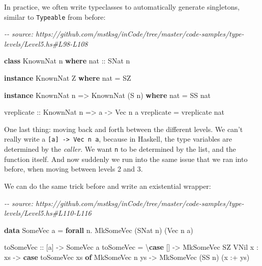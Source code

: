 \documentclass[]{article}
\newenvironment{Shaded}{}{}
\newcommand{\CommentTok}[1]{\textcolor[rgb]{0.38,0.63,0.69}{\textit{#1}}}
\newcommand{\DataTypeTok}[1]{\textcolor[rgb]{0.56,0.13,0.00}{#1}}
\newcommand{\KeywordTok}[1]{\textcolor[rgb]{0.00,0.44,0.13}{\textbf{#1}}}
\newcommand{\NormalTok}[1]{#1}
\newcommand{\OperatorTok}[1]{\textcolor[rgb]{0.40,0.40,0.40}{#1}}
\newcommand{\OtherTok}[1]{\textcolor[rgb]{0.00,0.44,0.13}{#1}}
\begin{document}
In practice, we often write typeclasses to automatically generate singletons,
similar to \texttt{Typeable} from before:

\begin{Shaded}
\begin{Highlighting}[]
\CommentTok{{-}{-} source: https://github.com/mstksg/inCode/tree/master/code{-}samples/type{-}levels/Level5.hs\#L98{-}L108}

\KeywordTok{class} \DataTypeTok{KnownNat}\NormalTok{ n }\KeywordTok{where}
\OtherTok{  nat ::} \DataTypeTok{SNat}\NormalTok{ n}

\KeywordTok{instance} \DataTypeTok{KnownNat} \DataTypeTok{Z} \KeywordTok{where}
\NormalTok{  nat }\OtherTok{=} \DataTypeTok{SZ}

\KeywordTok{instance} \DataTypeTok{KnownNat}\NormalTok{ n }\OtherTok{=\textgreater{}} \DataTypeTok{KnownNat}\NormalTok{ (}\DataTypeTok{S}\NormalTok{ n) }\KeywordTok{where}
\NormalTok{  nat }\OtherTok{=} \DataTypeTok{SS}\NormalTok{ nat}

\OtherTok{vreplicate\textquotesingle{} ::} \DataTypeTok{KnownNat}\NormalTok{ n }\OtherTok{=\textgreater{}}\NormalTok{ a }\OtherTok{{-}\textgreater{}} \DataTypeTok{Vec}\NormalTok{ n a}
\NormalTok{vreplicate\textquotesingle{} }\OtherTok{=}\NormalTok{ vreplicate nat}
\end{Highlighting}
\end{Shaded}

One last thing: moving back and forth between the different levels. We can't
really write a \texttt{{[}a{]}\ -\textgreater{}\ Vec\ n\ a}, because in Haskell,
the type variables are determined by the \emph{caller}. We want \texttt{n} to be
determined by the list, and the function itself. And now suddenly we run into
the same issue that we ran into before, when moving between levels 2 and 3.

We can do the same trick before and write an existential wrapper:

\begin{Shaded}
\begin{Highlighting}[]
\CommentTok{{-}{-} source: https://github.com/mstksg/inCode/tree/master/code{-}samples/type{-}levels/Level5.hs\#L110{-}L116}

\KeywordTok{data} \DataTypeTok{SomeVec}\NormalTok{ a }\OtherTok{=} \KeywordTok{forall}\NormalTok{ n}\OperatorTok{.} \DataTypeTok{MkSomeVec}\NormalTok{ (}\DataTypeTok{SNat}\NormalTok{ n) (}\DataTypeTok{Vec}\NormalTok{ n a)}

\OtherTok{toSomeVec ::}\NormalTok{ [a] }\OtherTok{{-}\textgreater{}} \DataTypeTok{SomeVec}\NormalTok{ a}
\NormalTok{toSomeVec }\OtherTok{=}\NormalTok{ \textbackslash{}}\KeywordTok{case}
\NormalTok{  [] }\OtherTok{{-}\textgreater{}} \DataTypeTok{MkSomeVec} \DataTypeTok{SZ} \DataTypeTok{VNil}
\NormalTok{  x }\OperatorTok{:}\NormalTok{ xs }\OtherTok{{-}\textgreater{}} \KeywordTok{case}\NormalTok{ toSomeVec xs }\KeywordTok{of}
    \DataTypeTok{MkSomeVec}\NormalTok{ n ys }\OtherTok{{-}\textgreater{}} \DataTypeTok{MkSomeVec}\NormalTok{ (}\DataTypeTok{SS}\NormalTok{ n) (x }\OperatorTok{:+}\NormalTok{ ys)}
\end{Highlighting}
\end{Shaded}
\end{document}
